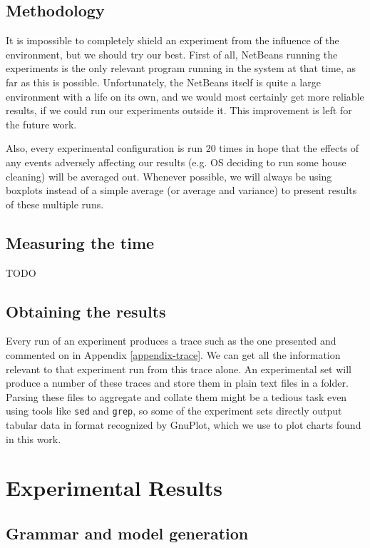 \documentclass[a4paper,12pt,oneside]{report}
\theoremstyle{definition}
\begin{document}
\subsection{Methodology}

It is impossible to completely shield an experiment from the influence of the environment, but we should try our best. First of all, NetBeans running the experiments is the only relevant program running in the system at that time, as far as this is possible. Unfortunately, the NetBeans itself is quite a large environment with a life on its own, and we would most certainly get more reliable results, if we could run our experiments outside it. This improvement is left for the future work.

Also, every experimental configuration is run 20 times in hope that the effects of any events adversely affecting our results (e.g. OS deciding to run some house cleaning) will be averaged out. Whenever possible, we will always be using boxplots instead of a simple average (or average and variance) to present results of these multiple runs. %

\subsection{Measuring the time}

TODO

\subsection{Obtaining the results}

Every run of an experiment produces a trace such as the one presented and commented on in Appendix \ref{appendix-trace}. We can get all the information relevant to that experiment run from this trace alone. An experimental set will produce a number of these traces and store them in plain text files in a folder. Parsing these files to aggregate and collate them might be a tedious task even using tools like \texttt{sed} and \texttt{grep}, so some of the experiment sets directly output tabular data in format recognized by GnuPlot, which we use to plot charts found in this work.

\section{Experimental Results}

\subsection{Grammar and model generation}
\end{document}
